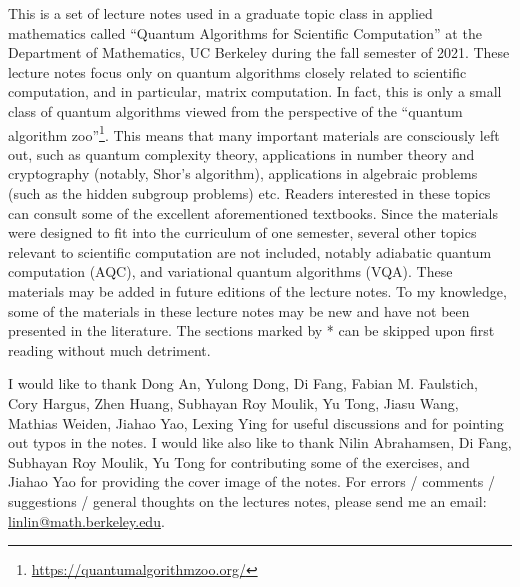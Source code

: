 This is a set of lecture notes used in a graduate topic class in applied
mathematics called ``Quantum Algorithms for Scientific Computation'' at the Department of Mathematics, UC Berkeley during the fall semester of 2021. 
These lecture  notes focus only on quantum algorithms closely related to scientific computation, and in particular, matrix computation.  In fact, this is only a small class of quantum algorithms viewed from the perspective of the ``quantum algorithm zoo''\footnote{\url{https://quantumalgorithmzoo.org/}}. This means that many important materials are consciously left out, such as
quantum complexity theory,  
applications in number theory and cryptography (notably, Shor's algorithm), applications in algebraic problems (such as the hidden subgroup problems) etc. 
Readers interested in these topics can consult some of the excellent aforementioned textbooks. 
Since the materials were designed to fit into the curriculum of one semester, several other topics relevant to scientific computation are not included, notably adiabatic quantum computation (AQC), and variational quantum algorithms (VQA). These materials may be added in future editions of the lecture notes.
To my knowledge, some of the materials in these lecture notes may be new and have not been presented in the literature. The sections marked by * can be skipped upon first reading without much detriment.


I would  like to thank Dong An, Yulong Dong, Di Fang, Fabian M. Faulstich, Cory Hargus, Zhen Huang, Subhayan Roy Moulik, Yu Tong, Jiasu Wang, Mathias Weiden, Jiahao Yao, Lexing Ying for useful discussions and for pointing out typos in the notes.
I would like also like to thank Nilin Abrahamsen, Di Fang, Subhayan Roy Moulik, Yu Tong for contributing some of the exercises, and Jiahao Yao for providing the cover image of the notes.
For errors / comments / suggestions / general thoughts on the lectures notes, please send me an email: \url{linlin@math.berkeley.edu}.



